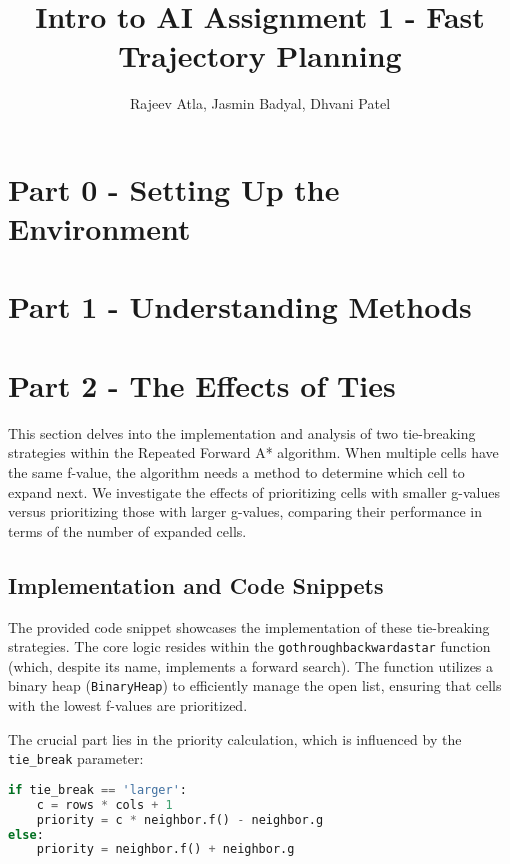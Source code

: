 \documentclass[12pt]{article}
\begin{document}
\title{Intro to AI Assignment 1 - Fast Trajectory Planning}
\author{Rajeev Atla, Jasmin Badyal, Dhvani Patel}
\maketitle



\setcounter{section}{-1}
\section{Part 0 - Setting Up the Environment}


\section{Part 1 - Understanding Methods}

\section{Part 2 - The Effects of Ties}

This section delves into the implementation and analysis of two tie-breaking strategies within the Repeated Forward A* algorithm. 
When multiple cells have the same f-value, 
the algorithm needs a method to determine which cell to expand next. 
We investigate the effects of prioritizing cells with smaller g-values versus prioritizing those with larger g-values, 
comparing their performance in terms of the number of expanded cells.

\subsection{Implementation and Code Snippets}

The provided code snippet showcases the implementation of these tie-breaking strategies. 
The core logic resides within the \texttt{gothroughbackwardastar} function 
(which, despite its name, implements a forward search). 
The function utilizes a binary heap (\texttt{BinaryHeap}) to efficiently manage the open list, 
ensuring that cells with the lowest f-values are prioritized.

The crucial part lies in the priority calculation, 
which is influenced by the \texttt{tie\_break} parameter:

\begin{lstlisting}[language=Python, basicstyle=\ttfamily]
if tie_break == 'larger':
    c = rows * cols + 1
    priority = c * neighbor.f() - neighbor.g
else:
    priority = neighbor.f() + neighbor.g
\end{lstlisting}
\end{document}
